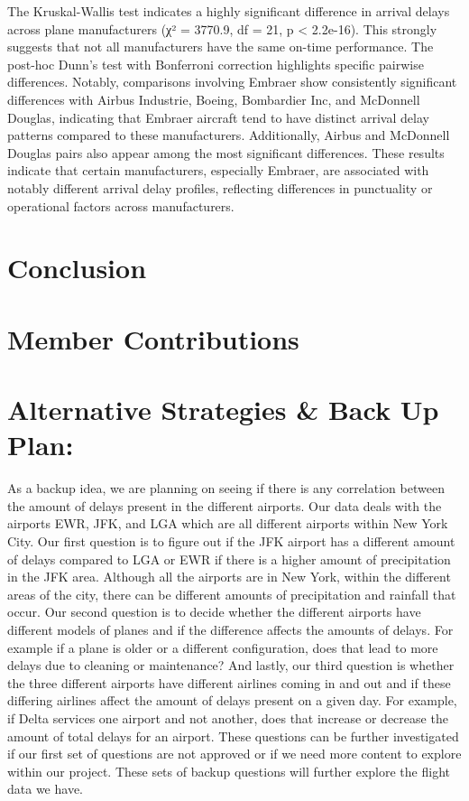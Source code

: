 \documentclass[
]{article}
\begin{document}
The Kruskal-Wallis test indicates a highly significant difference in
arrival delays across plane manufacturers (χ² = 3770.9, df = 21, p
\textless{} 2.2e-16). This strongly suggests that not all manufacturers
have the same on-time performance. The post-hoc Dunn's test with
Bonferroni correction highlights specific pairwise differences. Notably,
comparisons involving Embraer show consistently significant differences
with Airbus Industrie, Boeing, Bombardier Inc, and McDonnell Douglas,
indicating that Embraer aircraft tend to have distinct arrival delay
patterns compared to these manufacturers. Additionally, Airbus and
McDonnell Douglas pairs also appear among the most significant
differences. These results indicate that certain manufacturers,
especially Embraer, are associated with notably different arrival delay
profiles, reflecting differences in punctuality or operational factors
across manufacturers.

\newpage

\section{Conclusion}\label{conclusion}

\section{Member Contributions}\label{member-contributions}

\section{Alternative Strategies \& Back Up
Plan:}\label{alternative-strategies-back-up-plan}

As a backup idea, we are planning on seeing if there is any correlation
between the amount of delays present in the different airports. Our data
deals with the airports EWR, JFK, and LGA which are all different
airports within New York City. Our first question is to figure out if
the JFK airport has a different amount of delays compared to LGA or EWR
if there is a higher amount of precipitation in the JFK area. Although
all the airports are in New York, within the different areas of the
city, there can be different amounts of precipitation and rainfall that
occur. Our second question is to decide whether the different airports
have different models of planes and if the difference affects the
amounts of delays. For example if a plane is older or a different
configuration, does that lead to more delays due to cleaning or
maintenance? And lastly, our third question is whether the three
different airports have different airlines coming in and out and if
these differing airlines affect the amount of delays present on a given
day. For example, if Delta services one airport and not another, does
that increase or decrease the amount of total delays for an airport.
These questions can be further investigated if our first set of
questions are not approved or if we need more content to explore within
our project. These sets of backup questions will further explore the
flight data we have.
\end{document}
